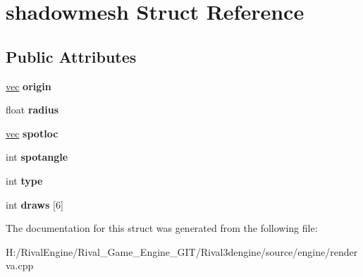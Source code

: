 \hypertarget{structshadowmesh}{}\section{shadowmesh Struct Reference}
\label{structshadowmesh}
\subsection*{Public Attributes}
\begin{DoxyCompactItemize}
\item 
\mbox{\label{structshadowmesh_aebd2f860e497838d1744ca16e9aecd36}} 
\hyperlink{structvec}{vec} {\bfseries origin}
\item 
\mbox{\label{structshadowmesh_aad411ada628c9b3bab73ab65993ec83d}} 
float {\bfseries radius}
\item 
\mbox{\label{structshadowmesh_a187bd1b9fe9020f6bbbdf7ae6131561a}} 
\hyperlink{structvec}{vec} {\bfseries spotloc}
\item 
\mbox{\label{structshadowmesh_a31f15bbaff5a4a35f38352dc3e7db692}} 
int {\bfseries spotangle}
\item 
\mbox{\label{structshadowmesh_a4bb096e5125728fe9b70f8fd2b538db3}} 
int {\bfseries type}
\item 
\mbox{\label{structshadowmesh_a0c4eff9898460363ceee1ed7c6ea2e19}} 
int {\bfseries draws} \mbox{[}6\mbox{]}
\end{DoxyCompactItemize}


The documentation for this struct was generated from the following file\+:\begin{DoxyCompactItemize}
\item 
H\+:/\+Rival\+Engine/\+Rival\+\_\+\+Game\+\_\+\+Engine\+\_\+\+G\+I\+T/\+Rival3dengine/source/engine/renderva.\+cpp\end{DoxyCompactItemize}
